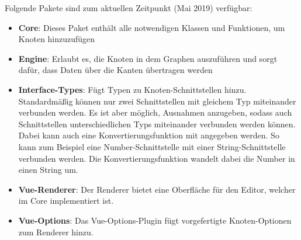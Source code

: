 Folgende Pakete sind zum aktuellen Zeitpunkt (Mai 2019) verfügbar:

\begin{itemize}
    \item \textbf{Core}: Dieses Paket enthält alle notwendigen Klassen und Funktionen, um Knoten hinzuzufügen 
    \item \textbf{Engine}: Erlaubt es, die Knoten in dem Graphen auszuführen und sorgt dafür, dass Daten über die Kanten übertragen werden
    \item \textbf{Interface-Types}: Fügt Typen zu Knoten-Schnittstellen hinzu. Standardmäßig können nur zwei Schnittstellen mit gleichem Typ miteinander verbunden werden. Es ist aber möglich, Ausnahmen anzugeben, sodass auch Schnittstellen unterschiedlichen Typs miteinander verbunden werden können. Dabei kann auch eine Konvertierungsfunktion mit angegeben werden. So kann zum Beispiel eine Number-Schnittstelle mit einer String-Schnittstelle verbunden werden. Die Konvertierungsfunktion wandelt dabei die Number in einen String um. 
    \item \textbf{Vue-Renderer}: Der Renderer bietet eine Oberfläche für den Editor, welcher im Core implementiert ist.
    \item \textbf{Vue-Options}: Das Vue-Options-Plugin fügt vorgefertigte Knoten-Optionen zum Renderer hinzu.
\end{itemize}